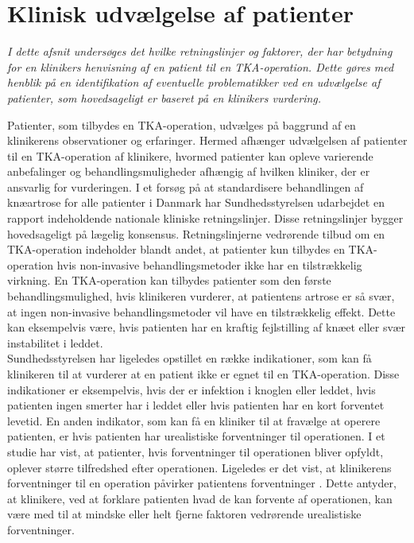 \section{Klinisk udvælgelse af patienter}\label{kliniskudvaelgelse}
\textit{I dette afsnit undersøges det hvilke retningslinjer og faktorer, der har betydning for en klinikers henvisning af en patient til en TKA-operation. Dette gøres med henblik på en identifikation af eventuelle problematikker ved en udvælgelse af patienter, som hovedsageligt er baseret på en klinikers vurdering.}

Patienter, som tilbydes en TKA-operation, udvælges på baggrund af en klinikerens observationer og erfaringer. Hermed afhænger udvælgelsen af patienter til en TKA-operation af klinikere, hvormed patienter kan opleve varierende anbefalinger og behandlingsmuligheder afhængig af hvilken kliniker, der er ansvarlig for vurderingen. I et forsøg på at standardisere behandlingen af knæartrose for alle patienter i Danmark har Sundhedsstyrelsen udarbejdet en rapport indeholdende nationale kliniske retningslinjer. Disse retningslinjer bygger hovedsageligt på lægelig konsensus. Retningslinjerne vedrørende tilbud om en TKA-operation indeholder blandt andet, at patienter kun tilbydes en TKA-operation hvis non-invasive behandlingsmetoder ikke har en tilstrækkelig virkning. En TKA-operation kan tilbydes patienter som den første behandlingsmulighed, hvis klinikeren vurderer, at patientens artrose er så svær, at ingen non-invasive behandlingsmetoder vil have en tilstrækkelig effekt. Dette kan eksempelvis være, hvis patienten har en kraftig fejlstilling af knæet eller svær instabilitet i leddet. \citep{brostrom2012} \\
Sundhedsstyrelsen har ligeledes opstillet en række indikationer, som kan få klinikeren til at vurderer at en patient ikke er egnet til en TKA-operation. Disse indikationer er eksempelvis, hvis der er infektion i knoglen eller leddet, hvis patienten ingen smerter har i leddet eller hvis patienten har en kort forventet levetid. En anden indikator, som kan få en kliniker til at fravælge at operere patienten, er hvis patienten har urealistiske forventninger til operationen. \citep{brostrom2012} I et studie har  vist, at patienter, hvis forventninger til operationen bliver opfyldt, oplever større tilfredshed efter operationen. Ligeledes er det vist, at klinikerens forventninger til en operation påvirker patientens forventninger \citep{tejada2010}. Dette antyder, at klinikere, ved at forklare patienten hvad de kan forvente af operationen, kan være med til at mindske eller helt fjerne faktoren vedrørende urealistiske forventninger. \\
